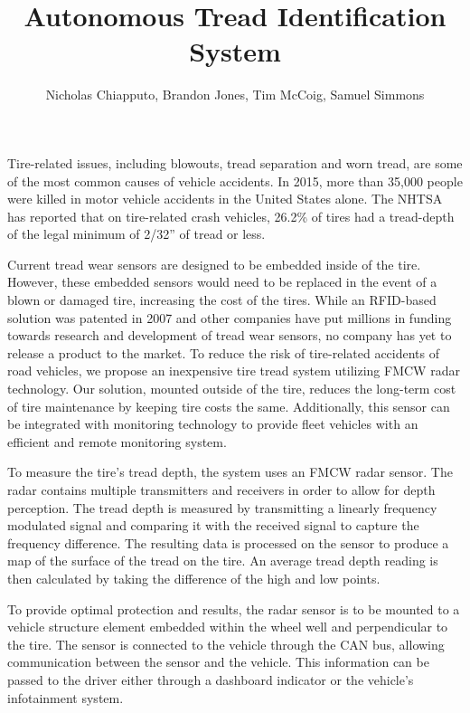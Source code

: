 \documentclass[11pt]{article}
\begin{document}
	\title{ \vspace{-0.0575in} Autonomous Tread Identification System }

	\author{ Nicholas Chiapputo, Brandon Jones, Tim McCoig, Samuel Simmons }

	\maketitle

	Tire-related issues, including blowouts, tread separation and worn tread, are some of the most common causes of vehicle accidents. In 2015, more than 35,000 people were killed in motor vehicle accidents in the United States alone. The NHTSA has reported that on tire-related crash vehicles, 26.2\% of tires had a tread-depth of the legal minimum of 2/32'' of tread or less. 

	Current tread wear sensors are designed to be embedded inside of the tire. However, these embedded sensors would need to be replaced in the event of a blown or damaged tire, increasing the cost of the tires. While an RFID-based solution was patented in 2007 and other companies have put millions in funding towards research and development of tread wear sensors, no company has yet to release a product to the market. To reduce the risk of tire-related accidents of road vehicles, we propose an inexpensive tire tread system utilizing FMCW radar technology. Our solution, mounted outside of the tire, reduces the long-term cost of tire maintenance by keeping tire costs the same. Additionally, this sensor can be integrated with monitoring technology to provide fleet vehicles with an efficient and remote monitoring system.

	To measure the tire’s tread depth, the system uses an FMCW radar sensor. The radar contains multiple transmitters and receivers in order to allow for depth perception. The tread depth is measured by transmitting a linearly frequency modulated signal and comparing it with the received signal to capture the frequency difference. The resulting data is processed on the sensor to produce a map of the surface of the tread on the tire. An average tread depth reading is then calculated by taking the difference of the high and low points. 

	To provide optimal protection and results, the radar sensor is to be mounted to a vehicle structure element embedded within the wheel well and perpendicular to the tire. The sensor is connected to the vehicle through the CAN bus, allowing communication between the sensor and the vehicle. This information can be passed to the driver either through a dashboard indicator or the vehicle’s infotainment system. 
\end{document}
